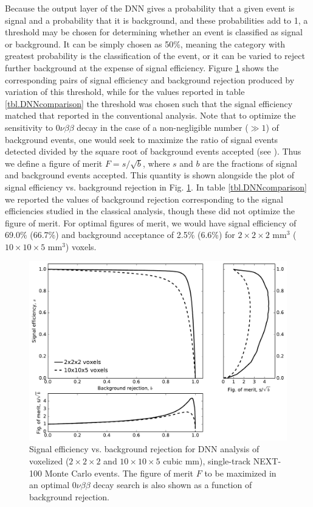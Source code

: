 \documentclass[a4paper,11pt]{article}
\begin{document}
Because the output layer of the DNN gives a probability that a given event is signal and a probability that it is background, and these probabilities add to 1, a threshold may be 
chosen for determining whether an event is classified as signal or background.  It can be simply chosen as 50\%, meaning the category with greatest probability is the classification of the
event, or it can be varied to reject further background at the expense of signal efficiency.  Figure \ref{fig_svsb} shows the corresponding pairs of signal efficiency and background 
rejection produced by variation of this threshold, while for the values reported in table \ref{tbl.DNNcomparison} the threshold was chosen such that the signal efficiency matched that reported in 
the conventional analysis.  Note that to optimize the sensitivity to $0\nu\beta\beta$ decay in the case of a non-negligible number ($\gg 1$) of background events, one would seek to maximize 
the ratio of signal events detected divided by the square root of background events accepted (see \cite{NEXT_sensitivity}).  Thus we define a figure of merit $F = s/\sqrt{b}$, where $s$ and 
$b$ are the fractions of signal and background events accepted.  
This quantity is shown alongside the plot of signal efficiency vs. background rejection in Fig. \ref{fig_svsb}.  In table \ref{tbl.DNNcomparison} we reported the values of background rejection 
corresponding to the signal efficiencies studied in the classical analysis, though these did not optimize the figure of merit.  For optimal figures of merit, we would have signal efficiency of 
69.0\% (66.7\%) and background acceptance of 2.5\% (6.6\%) for $2 \times 2 \times 2$ mm$^3$ ($10 \times 10 \times 5$ mm$^3$) voxels.

\begin{figure}[!htb]
	\centering
	\includegraphics[scale=0.6]{fig/sigvsbg_DNN.pdf}
	\caption{\label{fig_svsb}Signal efficiency vs. background rejection for DNN analysis of voxelized ($2 \times 2 \times 2$ and $10 \times 10 \times 5$ cubic mm), single-track NEXT-100 Monte Carlo events.  The figure of
		merit $F$ to be maximized in an optimal $0\nu\beta\beta$ decay search is also shown as a function of background rejection.}
\end{figure}
\end{document}
